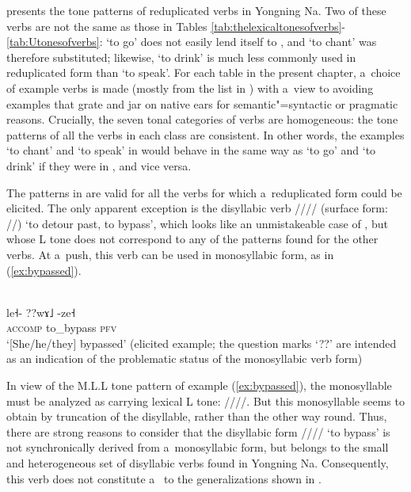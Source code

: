  presents the tone patterns of reduplicated verbs in Yongning Na. Two of these verbs are not the same as those in Tables \ref{tab:thelexicaltonesofverbs}-\ref{tab:Utonesofverbs}: ‘to go' does not easily lend itself to , and ‘to chant' was therefore substituted; likewise, ‘to drink' is much less commonly used in reduplicated form than ‘to speak'. For each table in the present chapter, a~choice of example verbs is made (mostly from the list in ) with a~view to avoiding examples that grate and jar on native ears for semantic"=syntactic or pragmatic reasons. Crucially, the seven tonal categories of verbs are homogeneous: the tone patterns of all the verbs in each class are consistent. In other words, the examples ‘to chant' and ‘to speak' in  would behave in the same way as ‘to go' and ‘to drink' if they were in , and vice versa. 

The patterns in  are valid for all the verbs for which a~reduplicated form could be elicited. The only apparent exception is the disyllabic verb //// (surface form:
//) ‘to detour past, to bypass’, which looks like an unmistakeable case of , but whose L tone does not correspond to any of the patterns found for the other verbs. At a~push, this verb can be used in {monosyllabic} form, as in (\ref{ex:bypassed}). 

\newpage 
% 
\begin{exe}
	\ex
	\label{ex:bypassed}
	\\
	\gll le˧-	??wɤ˩		-ze˧\\
	\textsc{accomp}		to\_bypass	\textsc{pfv}\\
	\glt ‘[She/he/they] bypassed’ (elicited example; the {question} marks ‘??’ are intended as an indication of the problematic status of the {monosyllabic} verb form)
\end{exe}

In view of the M.L.L tone pattern of example (\ref{ex:bypassed}), the monosyllable must be analyzed as carrying lexical L tone: ////. But this monosyllable seems to obtain by truncation of the disyllable, rather than the other way round. Thus, there are strong reasons to consider that the disyllabic form //// ‘to bypass’ is not synchronically derived from a~{monosyllabic} form, but belongs to the small and heterogeneous set of disyllabic verbs found in Yongning Na. Consequently, this verb does not constitute a~ to the generalizations shown in .

